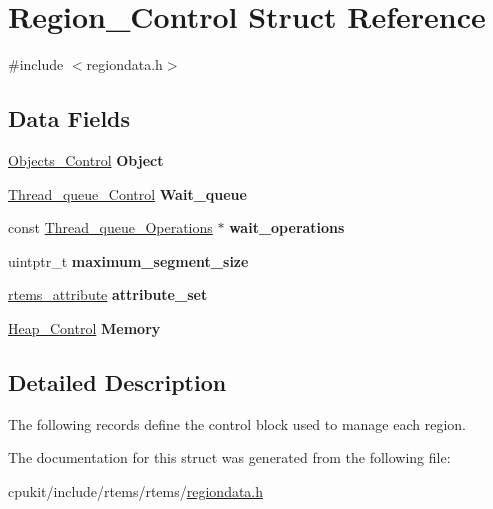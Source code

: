 \hypertarget{structRegion__Control}{}\section{Region\+\_\+\+Control Struct Reference}
\label{structRegion__Control}


{\ttfamily \#include $<$regiondata.\+h$>$}

\subsection*{Data Fields}
\begin{DoxyCompactItemize}
\item 
\mbox{\label{structRegion__Control_ab8f7bafeed29f462afcf99c28cd00302}} 
\mbox{\hyperlink{structObjects__Control}{Objects\+\_\+\+Control}} {\bfseries Object}
\item 
\mbox{\label{structRegion__Control_aa909426b24abafeb05d0548af8b44179}} 
\mbox{\hyperlink{structThread__queue__Control}{Thread\+\_\+queue\+\_\+\+Control}} {\bfseries Wait\+\_\+queue}
\item 
\mbox{\label{structRegion__Control_a61a1e533f35f49b56ebd21d3a06dedcc}} 
const \mbox{\hyperlink{structThread__queue__Operations}{Thread\+\_\+queue\+\_\+\+Operations}} $\ast$ {\bfseries wait\+\_\+operations}
\item 
\mbox{\label{structRegion__Control_a58ff2745892c2674ae2ba47893000906}} 
uintptr\+\_\+t {\bfseries maximum\+\_\+segment\+\_\+size}
\item 
\mbox{\label{structRegion__Control_a3e493950e1125101259aba2f1df31ce4}} 
\mbox{\hyperlink{group__ClassicAttributes_gaea40313cf78ed843e09c4315d0a10f79}{rtems\+\_\+attribute}} {\bfseries attribute\+\_\+set}
\item 
\mbox{\label{structRegion__Control_a2bf8b6fd02457743df6c5047c16793f4}} 
\mbox{\hyperlink{structHeap__Control}{Heap\+\_\+\+Control}} {\bfseries Memory}
\end{DoxyCompactItemize}


\subsection{Detailed Description}
The following records define the control block used to manage each region. 

The documentation for this struct was generated from the following file\+:\begin{DoxyCompactItemize}
\item 
cpukit/include/rtems/rtems/\mbox{\hyperlink{regiondata_8h}{regiondata.\+h}}\end{DoxyCompactItemize}
